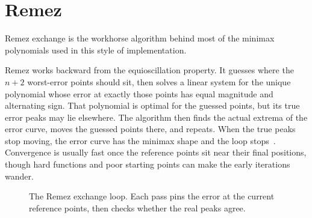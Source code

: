 \documentclass[manuscript, nonacm]{acmart}
\begin{document}


  \section{Remez}

  Remez exchange is the workhorse algorithm behind most of the minimax
  polynomials used in this style of implementation.

  Remez works backward from the equioscillation property. It guesses where the
  $n + 2$ worst-error points should sit, then solves a linear system for the
  unique polynomial whose error at exactly those points has equal magnitude and
  alternating sign. That polynomial is optimal for the guessed points, but its
  true error peaks may lie elsewhere. The algorithm then finds the actual
  extrema of the error curve, moves the guessed points there, and repeats. When
  the true peaks stop moving, the error curve has the minimax shape and the loop
  stops~\cite{muller}. Convergence is usually fast once the reference points sit
  near their final positions, though hard functions and poor starting points can
  make the early iterations wander.

  \begin{figure}[tbp]
    \centering
    \caption{The Remez exchange loop. Each pass pins the error at the
    current reference points, then checks whether the real peaks agree.}
  \end{figure}
\end{document}
